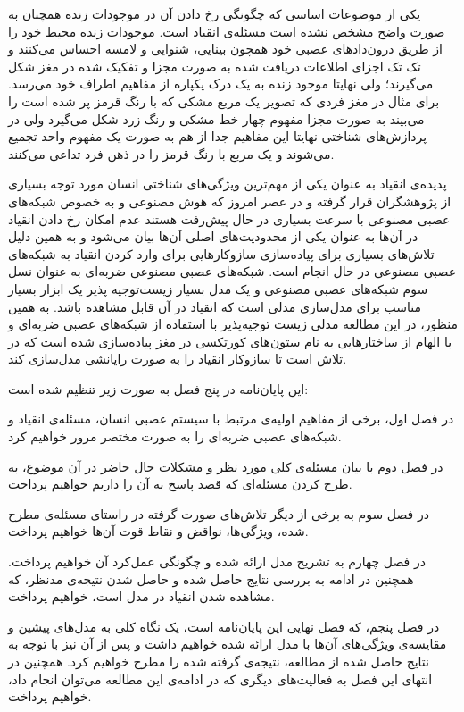 \documentclass[12pt]{report}
\begin{document}
	یکی از موضوعات اساسی که چگونگی رخ دادن آن در موجودات زنده همچنان به صورت واضح مشخص نشده است مسئله‌ی انقیاد است. موجودات زنده محیط خود را از طریق درون‌داد‌های عصبی خود همچون بینایی، شنوایی و لامسه احساس می‌کنند و تک تک اجزای اطلاعات دریافت شده به صورت مجزا و تفکیک شده در مغز شکل می‌گیرند؛ ولی نهایتا موجود زنده به یک درک یکپاره از مفاهیم اطراف خود می‌رسد. برای مثال در مغز فردی که تصویر یک مربع مشکی که با رنگ قرمز پر شده است را می‌بیند به صورت مجزا مفهوم چهار خط مشکی و رنگ زرد شکل می‌گیرد ولی در پردازش‌های شناختی نهایتا این مفاهیم جدا از هم به صورت یک مفهوم واحد تجمیع می‌شوند و یک مربع با رنگ قرمز را در ذهن فرد تداعی می‌کنند.
	
	پدیده‌ی انقیاد به عنوان یکی از مهم‌ترین ویژگی‌های شناختی انسان مورد توجه بسیاری از پژوهشگران قرار گرفته و در عصر امروز که هوش مصنوعی و به خصوص شبکه‌های عصبی مصنوعی با سرعت بسیاری در حال پیش‌رفت هستند عدم امکان رخ دادن انقیاد در آن‌ها به عنوان یکی از محدودیت‌های اصلی آن‌ها بیان می‌شود و به همین دلیل تلاش‌های بسیاری برای پیاده‌سازی سازوکار‌هایی برای وارد کردن انقیاد به شبکه‌های عصبی مصنوعی در حال انجام است. شبکه‌های عصبی مصنوعی ضربه‌ای به عنوان نسل سوم شبکه‌های عصبی مصنوعی و یک مدل بسیار زیست‌توجیه پذیر یک ابزار بسیار مناسب برای مدل‌سازی مدلی است که انقیاد در آن قابل مشاهده باشد. به همین منظور، در این مطالعه مدلی زیست توجیه‌پذیر با استفاده از شبکه‌های عصبی ضربه‌ای و با الهام از ساختار‌هایی به نام ستون‌های کورتکسی در مغز پیاده‌سازی شده است که در تلاش است تا سازوکار انقیاد را به صورت رایانشی مدل‌سازی کند.
	
	این پایان‌نامه در پنج فصل به صورت زیر تنظیم شده است:
	
در فصل اول، برخی از مفاهیم اولیه‌ی مرتبط با سیستم عصبی انسان، مسئله‌ی انقیاد و شبکه‌های عصبی ضربه‌ای را به صورت مختصر مرور خواهیم کرد.

در فصل دوم با بیان مسئله‌ی کلی مورد نظر و مشکلات حال حاضر در آن موضوع، به طرح کردن مسئله‌ای که قصد پاسخ به آن را داریم خواهیم پرداخت.

در فصل سوم به برخی از دیگر تلاش‌های صورت گرفته در راستای مسئله‌ی مطرح شده، ویژگی‌ها، نواقض و نقاط قوت آن‌ها خواهیم پرداخت.

در فصل چهارم به تشریح مدل ارائه شده و چگونگی عمل‌کرد آن خواهیم پرداخت. همچنین در ادامه به بررسی نتایج حاصل شده و حاصل شدن نتیجه‌ی مدنظر، که مشاهده شدن انقیاد در مدل است، خواهیم پرداخت.

در فصل پنجم، که فصل نهایی این پایان‌نامه است، یک نگاه کلی به مدل‌های پیشین و مقایسه‌ی ویژگی‌های آن‌ها با مدل ارائه شده خواهیم داشت و پس از آن نیز با توجه به نتایج حاصل شده از مطالعه، نتیجه‌ی گرفته شده را مطرح خواهیم کرد. همچنین در انتهای این فصل به فعالیت‌های دیگری که در ادامه‌ی این مطالعه می‌توان انجام داد، خواهیم پرداخت. 
	
\end{document}
